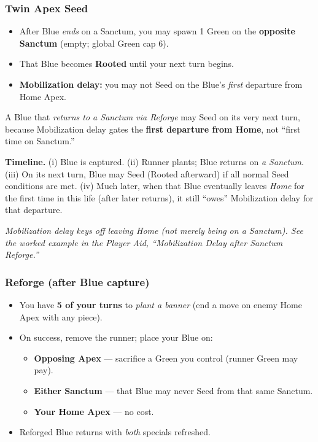 \documentclass[11pt]{article}
\begin{document}
\begin{multicols}{2}
\columnbreak

\subsubsection*{Twin Apex Seed}
\begin{itemize}[leftmargin=1.1em,itemsep=0.2em]
  \item After Blue \emph{ends} on a Sanctum, you may spawn 1 Green on the \textbf{opposite Sanctum} (empty; global Green cap 6).
  \item That Blue becomes \textbf{Rooted} until your next turn begins.
  \item \textbf{Mobilization delay:} you may not Seed on the Blue’s \emph{first} departure from Home Apex.
\end{itemize}

\begin{tcolorbox}[enhanced,breakable,title={Worked Example — Mobilization Delay after Sanctum Reforge},
  colback=white,colframe=royal,boxrule=0.8pt]
\small
A Blue that \emph{returns to a Sanctum via Reforge} may Seed on its very next turn, because Mobilization delay gates the \textbf{first departure from Home}, not “first time on Sanctum.”

\textbf{Timeline.} (i) Blue is captured. (ii) Runner plants; Blue returns on \emph{a Sanctum}. (iii) On its next turn, Blue may Seed (Rooted afterward) if all normal Seed conditions are met. (iv) Much later, when that Blue eventually leaves \emph{Home} for the first time in this life (after later returns), it still “owes” Mobilization delay for that departure.
\end{tcolorbox}

\noindent\textit{Mobilization delay keys off leaving Home (not merely being on a Sanctum). See the worked example in the Player Aid, “Mobilization Delay after Sanctum Reforge.”}

\subsubsection*{Reforge (after Blue capture)}
\begin{itemize}[leftmargin=1.1em,itemsep=0.2em]
  \item You have \textbf{5 of your turns} to \emph{plant a banner} (end a move on enemy Home Apex with any piece).
  \item On success, remove the runner; place your Blue on:
  \begin{itemize}[leftmargin=1.1em,itemsep=0.15em]
    \item \textbf{Opposing Apex} — sacrifice a Green you control (runner Green may pay).
    \item \textbf{Either Sanctum} — that Blue may never Seed from that same Sanctum.
    \item \textbf{Your Home Apex} — no cost.
  \end{itemize}
  \item Reforged Blue returns with \emph{both} specials refreshed.
\end{itemize}


\end{multicols}
\end{document}
